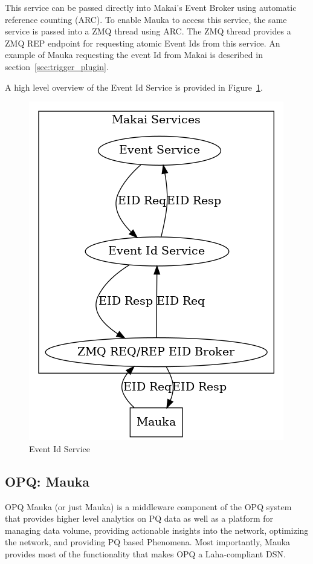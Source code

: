 This service can be passed directly into Makai's Event Broker using automatic reference counting (ARC). To enable Mauka to access this service, the same service is passed into a ZMQ thread using ARC. The ZMQ thread provides a ZMQ REP endpoint for requesting atomic Event Ids from this service. An example of Mauka requesting the event Id from Makai is described in section~\ref{sec:trigger_plugin}.

A high level overview of the Event Id Service is provided in Figure~\ref{fig:eid_service}.

\begin{figure}
	\centering
	\includegraphics[width=0.7\linewidth]{figures/event_id_service.png}
	\caption{Event Id Service}
	\label{fig:eid_service}
\end{figure}

\subsection{OPQ: Mauka}\label{subsec:opq:-mauka}
OPQ Mauka (or just Mauka) is a middleware component of the OPQ system that provides higher level analytics on PQ data as well as a platform for managing data volume, providing actionable insights into the network, optimizing the network, and providing PQ based Phenomena. Most importantly, Mauka provides most of the functionality that makes OPQ a Laha-compliant DSN\@.


